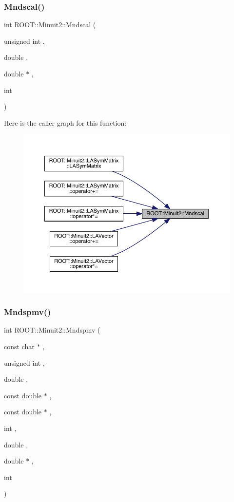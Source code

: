 \subsubsection{\texorpdfstring{Mndscal()}{Mndscal()}}
{\footnotesize\ttfamily int R\+O\+O\+T\+::\+Minuit2\+::\+Mndscal (\begin{DoxyParamCaption}\item[{unsigned int}]{,  }\item[{double}]{,  }\item[{double $\ast$}]{,  }\item[{int}]{ }\end{DoxyParamCaption})}

Here is the caller graph for this function\+:
\nopagebreak
\begin{figure}[H]
\begin{center}
\leavevmode
\includegraphics[width=350pt]{d6/d3a/namespaceROOT_1_1Minuit2_a8d430fbbb8b24669bd04e922230451ff_icgraph}
\end{center}
\end{figure}
\mbox{\label{namespaceROOT_1_1Minuit2_ad193f5f7fa4c96ebf1fe98c72ab22ca2}} 
\subsubsection{\texorpdfstring{Mndspmv()}{Mndspmv()}}
{\footnotesize\ttfamily int R\+O\+O\+T\+::\+Minuit2\+::\+Mndspmv (\begin{DoxyParamCaption}\item[{const char $\ast$}]{,  }\item[{unsigned int}]{,  }\item[{double}]{,  }\item[{const double $\ast$}]{,  }\item[{const double $\ast$}]{,  }\item[{int}]{,  }\item[{double}]{,  }\item[{double $\ast$}]{,  }\item[{int}]{ }\end{DoxyParamCaption})}

